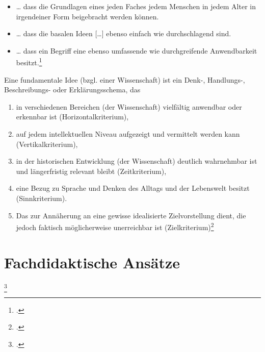 \documentclass{lehramt-informatik-haupt}
\begin{document}
\begin{itemize}
\item … dass die Grundlagen eines jeden Faches jedem Menschen in jedem
Alter in irgendeiner Form beigebracht werden können.

\item … dass die basalen Ideen […] ebenso einfach wie durchschlagend
sind.

\item … dass ein Begriff eine ebenso umfassende wie durchgreifende
Anwendbarkeit besitzt.\footcite[Seite 12]{ddi:fs:1}
\end{itemize}

Eine fundamentale Idee (bzgl. einer Wissenschaft) ist ein Denk-,
Handlungs-, Beschreibungs- oder Erklärungsschema, das

\begin{enumerate}


\item in verschiedenen Bereichen (der Wissenschaft) vielfältig anwendbar
oder erkennbar ist (Horizontalkriterium),


\item auf jedem intellektuellen Niveau aufgezeigt und vermittelt werden
kann (Vertikalkriterium),


\item in der historischen Entwicklung (der Wissenschaft) deutlich
wahrnehmbar ist und längerfristig relevant bleibt (Zeitkriterium),


\item eine Bezug zu Sprache und Denken des Alltags und der Lebenswelt
besitzt (Sinnkriterium).


\item Das zur Annäherung an eine gewisse idealisierte Zielvorstellung
dient, die jedoch faktisch möglicherweise unerreichbar ist
(Zielkriterium)\footcite[Seite 13]{ddi:fs:1}
\end{enumerate}

%

\section{Fachdidaktische Ansätze}\footcite[Forneck.1990, Seite 12]{ddi:fs:1}
\end{document}
